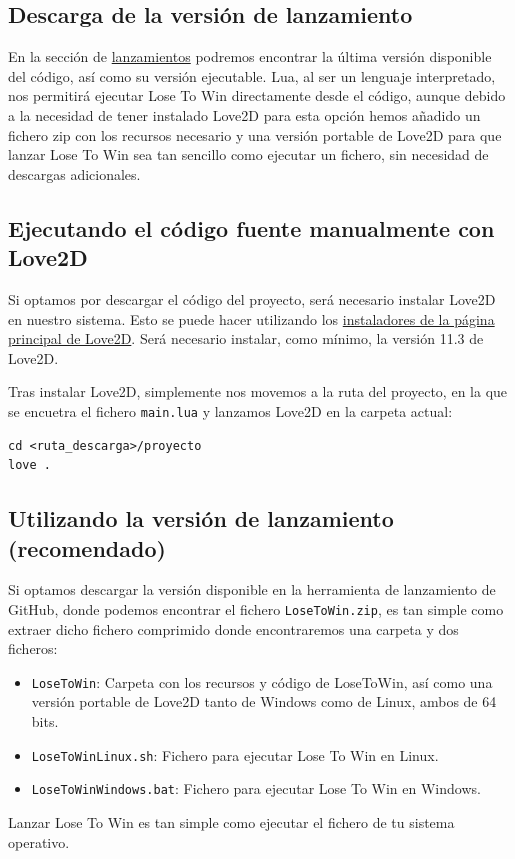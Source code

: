 \documentclass[12pt, spanish]{article}
\begin{document}
\subsection{Descarga de la versión de lanzamiento}

En la sección de \href{https://github.com/advy99/PLUD/releases}{lanzamientos} podremos encontrar la última versión disponible del código, así como su versión ejecutable. Lua, al ser un lenguaje interpretado, nos permitirá ejecutar Lose To Win directamente desde el código, aunque debido a la necesidad de tener instalado Love2D para esta opción hemos añadido un fichero zip con los recursos necesario y una versión portable de Love2D para que lanzar Lose To Win sea tan sencillo como ejecutar un fichero, sin necesidad de descargas adicionales.

\subsection{Ejecutando el código fuente manualmente con Love2D}

Si optamos por descargar el código del proyecto, será necesario instalar Love2D en nuestro sistema. Esto se puede hacer utilizando los \href{https://love2d.org/}{instaladores de la página principal de Love2D}. Será necesario instalar, como mínimo, la versión 11.3 de Love2D.

Tras instalar Love2D, simplemente nos movemos a la ruta del proyecto, en la que se encuetra el fichero \texttt{main.lua} y lanzamos Love2D en la carpeta actual:

\begin{lstlisting}
cd <ruta_descarga>/proyecto
love .
\end{lstlisting}

\subsection{Utilizando la versión de lanzamiento (recomendado)}

Si optamos descargar la versión disponible en la herramienta de lanzamiento de GitHub, donde podemos encontrar el fichero \texttt{LoseToWin.zip}, es tan simple como extraer dicho fichero comprimido donde encontraremos una carpeta y dos ficheros:

\begin{itemize}
	\item \texttt{LoseToWin}: Carpeta con los recursos y código de LoseToWin, así como una versión portable de Love2D tanto de Windows como de Linux, ambos de 64 bits.
	\item \texttt{LoseToWinLinux.sh}: Fichero para ejecutar Lose To Win en Linux.
	\item \texttt{LoseToWinWindows.bat}: Fichero para ejecutar Lose To Win en Windows.
\end{itemize}

Lanzar Lose To Win es tan simple como ejecutar el fichero de tu sistema operativo.
\end{document}
